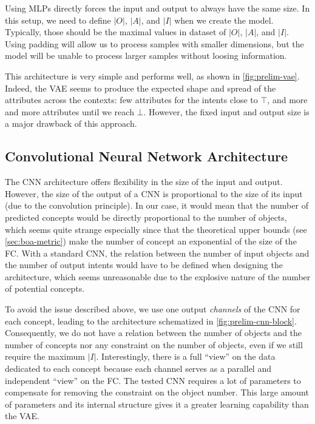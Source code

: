Using MLPs directly forces the input and output to always have the same size.
In this setup, we need to define $|O|$, $|A|$, and $|I|$ when we create the model.
Typically, those should be the maximal values in dataset of $|O|$, $|A|$, and $|I|$.
Using padding will allow us to process samples with smaller dimensions, but the model will be unable to process larger samples without loosing information.

This architecture is very simple and performs well, as shown in \cref{fig:prelim-vae}.
Indeed, the VAE seems to produce the expected shape and spread of the attributes across the contexts: few attributes for the intents close to $\top$, and more and more attributes until we reach $\bot$.
However, the fixed input and output size is a major drawback of this approach.

\subsection{Convolutional Neural Network Architecture}\label{sec:prelim-cnn}
The CNN architecture offers flexibility in the size of the input and output.
However, the size of the output of a CNN is proportional to the size of its input (due to the convolution principle).
In our case, it would mean that the number of predicted concepts would be directly proportional to the number of objects, which seems quite strange especially since that the theoretical upper bounds (see \cref{sec:boa-metric}) make the number of concept an exponential of the size of the FC.
With a standard CNN, the relation between the number of input objects and the number of output intents would have to be defined when designing the architecture, which seems unreasonable due to the explosive nature of the number of potential concepts.
 
To avoid the issue described above, we use one output \textit{channels} of the CNN for each concept, leading to the architecture schematized in \cref{fig:prelim-cnn-block}.
Consequently, we do not have a relation between the number of objects and the number of concepts nor any constraint on the number of objects, even if we still require the maximum $|I|$.
Interestingly, there is a full ``view'' on the data dedicated to each concept because each channel serves as a parallel and independent ``view'' on the FC.
The tested CNN requires a lot of parameters to compensate for removing the constraint on the object number. This large amount of parameters and its internal structure gives it a greater learning capability than the VAE. 

